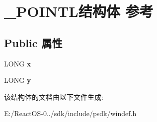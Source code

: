 \hypertarget{struct___p_o_i_n_t_l}{}\section{\+\_\+\+P\+O\+I\+N\+T\+L结构体 参考}
\label{struct___p_o_i_n_t_l}
\subsection*{Public 属性}
\begin{DoxyCompactItemize}
\item 
\mbox{\label{struct___p_o_i_n_t_l_a92b45f7f0034cfdff480615a88e3ed34}} 
L\+O\+NG {\bfseries x}
\item 
\mbox{\label{struct___p_o_i_n_t_l_a8887a518ee92cd9660be7c52fd1c6f7b}} 
L\+O\+NG {\bfseries y}
\end{DoxyCompactItemize}


该结构体的文档由以下文件生成\+:\begin{DoxyCompactItemize}
\item 
E\+:/\+React\+O\+S-\/0../sdk/include/psdk/windef.\+h\end{DoxyCompactItemize}
